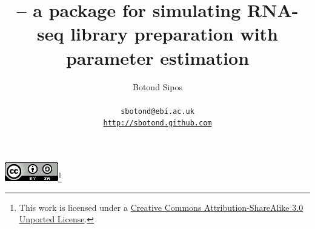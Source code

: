 \documentclass[a4paper, twosided]{article}
\title{\rlsim -- a package for simulating RNA-seq library preparation with parameter estimation}
\author{Botond Sipos\\ \\{\tt sbotond@ebi.ac.uk}\\{\tt \href{http://sbotond.github.com}{http://sbotond.github.com}}}
\begin{document}
\maketitle
\begin{center}
\href{http://creativecommons.org/licenses/by-sa/3.0/}{\includegraphics[scale=0.45]{pix/cc.png}}\footnote{This work is licensed under a \href{http://creativecommons.org/licenses/by-sa/3.0/}{Creative Commons Attribution-ShareAlike 3.0 Unported License}.}
\end{center}

\tableofcontents









\end{document}

